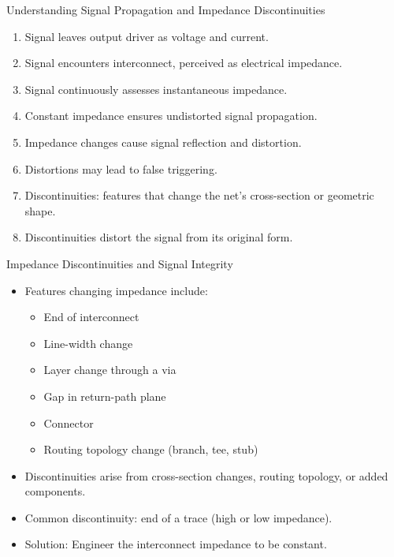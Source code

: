 \documentclass[10pt,hyperref={pdfpagemode=FullScreen},aspectratio=169]{beamer}
\begin{document}
  \begin{frame}{Understanding Signal Propagation and Impedance Discontinuities}
    \begin{enumerate}
      \item Signal leaves output driver as voltage and current.
      \item Signal encounters interconnect, perceived as electrical impedance.
      \item Signal continuously assesses instantaneous impedance.
      \item Constant impedance ensures undistorted signal propagation.
      \item Impedance changes cause signal reflection and distortion.
      \item Distortions may lead to false triggering.
      \item Discontinuities: features that change the net's cross-section or geometric shape.
      \item Discontinuities distort the signal from its original form.
    \end{enumerate}
  \end{frame}



\begin{frame}{Impedance Discontinuities and Signal Integrity}
  \begin{itemize}
    \item Features changing impedance include:
      \begin{itemize}
        \item End of interconnect
        \item Line-width change
        \item Layer change through a via
        \item Gap in return-path plane
        \item Connector
        \item Routing topology change (branch, tee, stub)
      \end{itemize}
    \item Discontinuities arise from cross-section changes, routing topology, or added components.
    \item Common discontinuity: end of a trace (high or low impedance).
    \item Solution: Engineer the interconnect impedance to be constant.
  \end{itemize}
\end{frame}
\end{document}
